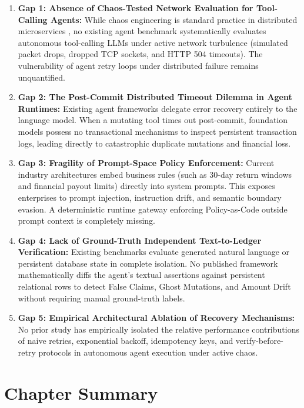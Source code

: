 \begin{enumerate}
    \item \textbf{Gap 1: Absence of Chaos-Tested Network Evaluation for Tool-Calling Agents:}
    While chaos engineering is standard practice in distributed microservices \cite{basu2024chaos}, no existing agent benchmark systematically evaluates autonomous tool-calling LLMs under active network turbulence (simulated packet drops, dropped TCP sockets, and HTTP 504 timeouts). The vulnerability of agent retry loops under distributed failure remains unquantified.

    \item \textbf{Gap 2: The Post-Commit Distributed Timeout Dilemma in Agent Runtimes:}
    Existing agent frameworks delegate error recovery entirely to the language model. When a mutating tool times out post-commit, foundation models possess no transactional mechanisms to inspect persistent transaction logs, leading directly to catastrophic duplicate mutations and financial loss.

    \item \textbf{Gap 3: Fragility of Prompt-Space Policy Enforcement:}
    Current industry architectures embed business rules (such as 30-day return windows and financial payout limits) directly into system prompts. This exposes enterprises to prompt injection, instruction drift, and semantic boundary evasion. A deterministic runtime gateway enforcing Policy-as-Code outside prompt context is completely missing.

    \item \textbf{Gap 4: Lack of Ground-Truth Independent Text-to-Ledger Verification:}
    Existing benchmarks evaluate generated natural language or persistent database state in complete isolation. No published framework mathematically diffs the agent's textual assertions against persistent relational rows to detect False Claims, Ghost Mutations, and Amount Drift without requiring manual ground-truth labels.

    \item \textbf{Gap 5: Empirical Architectural Ablation of Recovery Mechanisms:}
    No prior study has empirically isolated the relative performance contributions of naive retries, exponential backoff, idempotency keys, and verify-before-retry protocols in autonomous agent execution under active chaos.
\end{enumerate}

\section{Chapter Summary}

